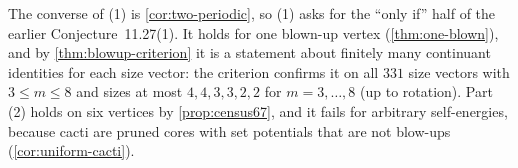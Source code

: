 The converse of (1) is \cref{cor:two-periodic}, so (1) asks for the ``only if'' half of the earlier Conjecture~11.27(1). It holds for one blown-up vertex (\cref{thm:one-blown}), and by \cref{thm:blowup-criterion} it is a statement about finitely many continuant identities for each size vector: the criterion confirms it on all $331$ size vectors with $3\le m\le8$ and sizes at most $4,4,3,3,2,2$ for $m=3,\dots,8$ (up to rotation). Part (2) holds on six vertices by \cref{prop:census67}, and it fails for arbitrary self-energies, because cacti are pruned cores with set potentials that are not blow-ups (\cref{cor:uniform-cacti}).
